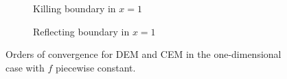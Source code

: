 \begin{figure}[t]
    \centering
    \begin{subfigure}{0.49\linewidth}
        \centering
        \resizebox{1\linewidth}{!}{ }  
        \caption{Killing boundary in $x = 1$}
        \label{fig:KillOneDRough}
    \end{subfigure}
    \begin{subfigure}{0.49\linewidth}
        \centering
        \resizebox{1\linewidth}{!}{ }  
        \caption{Reflecting boundary in $x = 1$}
        \label{fig:ReflectOneDRough}
    \end{subfigure}    
    \caption{Orders of convergence for DEM and CEM in the one-dimensional case with $f$ piecewise constant.}
    \label{fig:OrdersOneDRough}
\end{figure}
